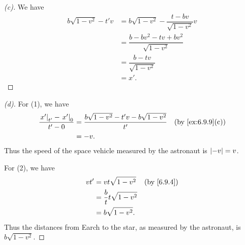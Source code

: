 \begin{proof}[(c)]
  We have
  \begin{align*}
    b \sqrt{1 - v^2} - t' v & = b \sqrt{1 - v^2} - \dfrac{t - bv}{\sqrt{1 - v^2}} v \\
                            & = \dfrac{b - b v^2 - tv + b v^2}{\sqrt{1 - v^2}}      \\
                            & = \dfrac{b - tv}{\sqrt{1 - v^2}}                      \\
                            & = x'.
  \end{align*}
\end{proof}

\begin{proof}[(d)]
  For (1), we have
  \begin{align*}
    \dfrac{\eval{x'}_{t'} - \eval{x'}_0}{t' - 0} & = \dfrac{b \sqrt{1 - v^2} - t' v - b \sqrt{1 - v^2}}{t'} &  & \by{ex:6.9.9}[c] \\
                                                 & = -v.
  \end{align*}
  Thus the speed of the space vehicle measured by the astronaut is \(\left\lvert-v\right\rvert = v\).

  For (2), we have
  \begin{align*}
    v t' & = v t \sqrt{1 - v^2}            &  & \by{6.9.4} \\
         & = \dfrac{b}{t} t \sqrt{1 - v^2}                 \\
         & = b \sqrt{1 - v^2}.
  \end{align*}
  Thus the distances from Earch to the star, as measured by the astronaut, is \(b \sqrt{1 - v^2}\).
\end{proof}
